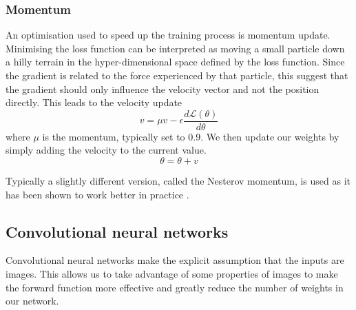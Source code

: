 \documentclass[12pt,a4paper,twoside,openright]{report}
\begin{document}
\subsubsection{Momentum}
An optimisation used to speed up the training process is momentum update. Minimising the loss function can be interpreted as moving a small particle down a hilly terrain in the hyper-dimensional space defined by the loss function. Since the gradient is related to the force experienced by that particle, this suggest that the gradient should only influence the velocity vector and not the position directly. This leads to the velocity update
\begin{equation}
	v = \mu  v - \epsilon \frac{d\mathcal{L}(\theta)}{d\theta}
\end{equation}
where $\mu$ is the momentum, typically set to 0.9. We then update our weights by simply adding the velocity to the current value.
\begin{equation}
	\theta = \theta + v
\end{equation}

Typically a slightly different version, called the Nesterov momentum, is used as it has been shown to work better in practice \cite{nesterov_momentum}.

\subsection{Convolutional neural networks}
Convolutional neural networks make the explicit assumption that the inputs are images. This allows us to take advantage of some properties of images to make the forward function more effective and greatly reduce the number of weights in our network. 
\end{document}
